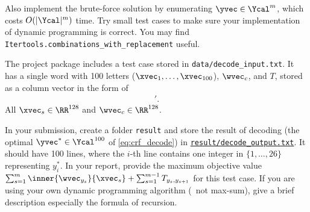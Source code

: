 \documentclass[11pt]{report}
\begin{document}
\begin{itemize}
	Also implement the brute-force solution by enumerating $\yvec \in \Ycal^m$, which costs $O(|\Ycal|^m)$ time.  Try small test cases to make sure your implementation of dynamic programming is correct.
	You may find \verb#Itertools.combinations_with_replacement# useful.
	
	The project package includes a test case stored in \verb#data/decode_input.txt#.
	It has a single word with 100 letters ($\xvec_1, \ldots, \xvec_{100}$), $\wvec_c$, and $T$, stored as a column vector in the form of
	\begin{align}
		[\xvec'_1, \ldots, \xvec'_{100}, \wvec'_1, \ldots, \wvec'_{26}, T_{1,1}, T_{1,2}, \ldots, T_{1, 26}, T_{2,1}, \ldots, T_{2, 26}, \ldots, T_{26,1}, \ldots, T_{26, 26}]'.
	\end{align}
	All $\xvec_s \in \RR^{128}$ and $\wvec_c \in \RR^{128}$.
	
	\begin{center}
	\end{center}
	
	In your submission, create a folder \verb#result# and store the result of decoding (the optimal $\yvec^* \in \Ycal^{100}$ of \eqref{eq:crf_decode}) in \underline{\texttt{result/decode\_output.txt}}.
	It should have 100 lines,
	where the $i$-th line contains one integer in $\{1,\ldots,26\}$ representing $y^*_i$.
	In your report, provide the maximum objective value $\sum_{s=1}^m \inner{\wvec_{y_s}}{\xvec_s} + \sum_{s=1}^{m-1} T_{y_s, y_{s+1}}$ for this test case.
	If you are using your own dynamic programming algorithm (\ie\ not max-sum),
	give a brief description especially the formula of recursion.
\end{itemize}

%
%
%
%
%
%
%
\end{document}
